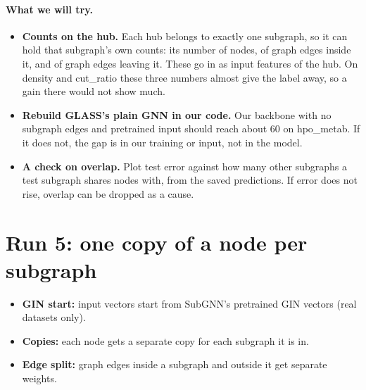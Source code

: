 \documentclass[11pt]{article}
\begin{document}
\paragraph{What we will try.}
\begin{itemize}[itemsep=2pt]
  \item \textbf{Counts on the hub.} Each hub belongs to exactly one subgraph, so it can hold that
        subgraph's own counts: its number of nodes, of graph edges inside it, and of graph edges
        leaving it. These go in as input features of the hub. On density and cut\_ratio these
        three numbers almost give the label away, so a gain there would not show much.
  \item \textbf{Rebuild GLASS's plain GNN in our code.} Our backbone with no subgraph edges and
        pretrained input should reach about 60 on hpo\_metab. If it does not, the gap is in our
        training or input, not in the model.
  \item \textbf{A check on overlap.} Plot test error against how many other subgraphs a test
        subgraph shares nodes with, from the saved predictions. If error does not rise, overlap
        can be dropped as a cause.
\end{itemize}

\section*{Run 5: one copy of a node per subgraph}

\begin{itemize}[itemsep=1pt]
  \item \textbf{GIN start:} input vectors start from SubGNN's pretrained GIN vectors (real datasets only).
  \item \textbf{Copies:} each node gets a separate copy for each subgraph it is in.
  \item \textbf{Edge split:} graph edges inside a subgraph and outside it get separate weights.
\end{itemize}
\end{document}
